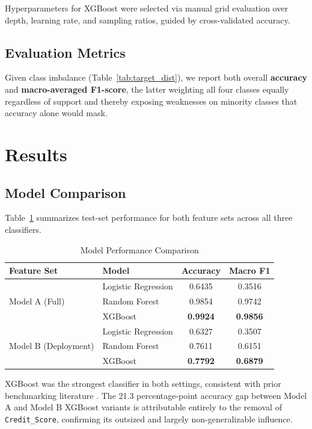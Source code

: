 \documentclass[conference]{IEEEtran}
\begin{document}
Hyperparameters for XGBoost were selected via manual grid evaluation over depth, learning rate, and sampling ratios, guided by cross-validated accuracy.

\subsection{Evaluation Metrics}

Given class imbalance (Table~\ref{tab:target_dist}), we report both overall \textbf{accuracy} and \textbf{macro-averaged F1-score}, the latter weighting all four classes equally regardless of support and thereby exposing weaknesses on minority classes that accuracy alone would mask.

\section{Results}

\subsection{Model Comparison}

Table~\ref{tab:results} summarizes test-set performance for both feature sets across all three classifiers.

\begin{table}[htbp]
\caption{Model Performance Comparison}
\label{tab:results}
\centering
\begin{tabular}{llcc}
\toprule
\textbf{Feature Set} & \textbf{Model} & \textbf{Accuracy} & \textbf{Macro F1} \\
\midrule
\multirow{3}{*}{Model A (Full)}
 & Logistic Regression & 0.6435 & 0.3516 \\
 & Random Forest        & 0.9854 & 0.9742 \\
 & XGBoost               & \textbf{0.9924} & \textbf{0.9856} \\
\midrule
\multirow{3}{*}{Model B (Deployment)}
 & Logistic Regression & 0.6327 & 0.3507 \\
 & Random Forest        & 0.7611 & 0.6151 \\
 & XGBoost               & \textbf{0.7792} & \textbf{0.6879} \\
\bottomrule
\end{tabular}
\end{table}

XGBoost was the strongest classifier in both settings, consistent with prior benchmarking literature \cite{lessmann2015}. The 21.3 percentage-point accuracy gap between Model A and Model B XGBoost variants is attributable entirely to the removal of \texttt{Credit\_Score}, confirming its outsized and largely non-generalizable influence.
\end{document}
